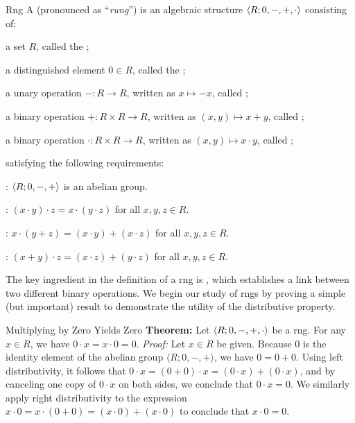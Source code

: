 \documentclass[12pt]{report}
\begin{document}
\begin{dfnbox}{Rng}
	A  (pronounced as ``\textit{rung}'') is an algebraic structure ${\langle {R; 0, -, +, \cdot} \rangle}$ consisting of:
	\begin{boxitems}
		\item a set $R$, called the ;
		\item a distinguished element $0 \in R$, called the ;
		\item a unary operation $-: R \to R$, written as $x \mapsto -x$, called ;
		\item a binary operation $+: R \times R \to R$, written as $(x, y) \mapsto x + y$, called ;
		\item a binary operation $\cdot: R \times R \to R$, written as $(x, y) \mapsto x \cdot y$, called ;
	\end{boxitems}
	satisfying the following requirements:
	\begin{boxitems}
		\item {}: ${\langle {R; 0, -, +} \rangle}$ is an abelian group.
		\item {}: $(x \cdot y) \cdot z = x \cdot (y \cdot z)$ for all $x, y, z \in R$.
		\item {}: $x \cdot (y + z) = (x \cdot y) + (x \cdot z)$ for all $x, y, z \in R$.
		\item {}: $(x + y) \cdot z = (x \cdot z) + (y \cdot z)$ for all $x, y, z \in R$.
	\end{boxitems}
\end{dfnbox}

The key ingredient in the definition of a rng is , which establishes a link between two different binary operations. We begin our study of rngs by proving a simple (but important) result to demonstrate the utility of the distributive property.

\begin{thmbox}{Multiplying by Zero Yields Zero}
	\textbf{Theorem:} Let ${\langle {R; 0, -, +, \cdot} \rangle}$ be a rng. For any $x \in R$, we have $0 \cdot x = x \cdot 0 = 0$.
\tcblower
	\textit{Proof:} Let $x \in R$ be given. Because $0$ is the identity element of the abelian group $\langle R; 0, -, + \rangle$, we have $0 = 0 + 0$. Using left distributivity, it follows that $0 \cdot x = (0 + 0) \cdot x = (0 \cdot x) + (0 \cdot x)$, and by canceling one copy of $0 \cdot x$ on both sides, we conclude that $0 \cdot x = 0$. We similarly apply right distributivity to the expression $x \cdot 0 = x \cdot (0 + 0) = (x \cdot 0) + (x \cdot 0)$ to conclude that $x \cdot 0 = 0$.
\end{thmbox}
\end{document}
